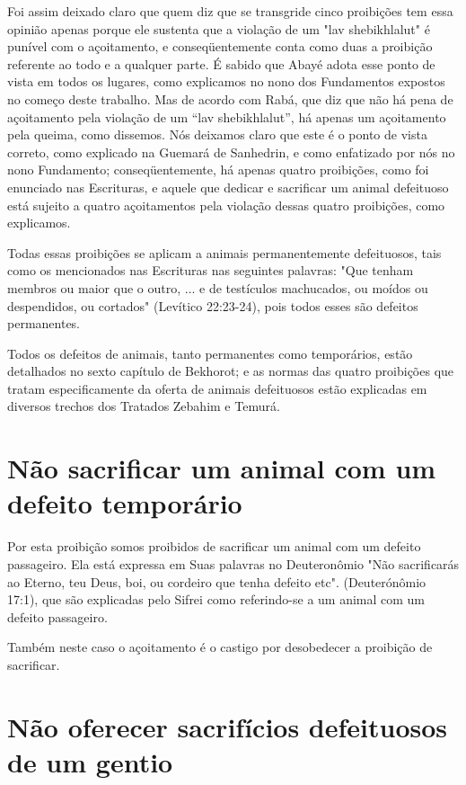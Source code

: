 Foi assim deixado claro que quem diz que se transgride cinco proi­bições
tem essa opinião apenas porque ele sustenta que a violação de um "lav
shebikhlalut" é punível com o açoitamento, e conseqüentemente conta como
duas a proibição referente ao todo e a qualquer parte. É sabido que
Abayé ado­ta esse ponto de vista em todos os lugares, como explicamos no
nono dos Fun­damentos expostos no começo deste trabalho. Mas de acordo
com Rabá, que diz que não há pena de açoitamento pela violação de um
``lav shebikhlalut'', há apenas um açoitamento pela queima, como dissemos.
Nós deixamos claro que este é o ponto de vista correto, como explicado
na Guemará de Sanhedrin, e como enfatizado por nós no nono Fundamento;
conseqüentemente, há ape­nas quatro proibições, como foi enunciado nas
Escrituras, e aquele que dedicar e sacrificar um animal defeituoso está
sujeito a quatro açoitamentos pela viola­ção dessas quatro proibições,
como explicamos.

Todas essas proibições se aplicam a animais permanentemente
de­feituosos, tais como os mencionados nas Escrituras nas seguintes
palavras: "Que tenham membros ou maior que o outro, ... e de testículos
machucados, ou moí­dos ou despendidos, ou cortados" (Levítico 22:23-24),
pois todos esses são de­feitos permanentes.

Todos os defeitos de animais, tanto permanentes como temporários, estão
detalhados no sexto capítulo de Bekhorot; e as normas das quatro
proibi­ções que tratam especificamente da oferta de animais defeituosos
estão expli­cadas em diversos trechos dos Tratados Zebahim e Temurá.


\section{Não sacrificar um animal com um defeito temporário}


Por esta proibição somos proibidos de sacrificar um animal com um
defeito passageiro. Ela está expressa em Suas palavras no Deuteronômio
"Não sacrificarás ao Eterno, teu Deus, boi, ou cordeiro que tenha
defeito etc". (Deu­terónômio 17:1), que são explicadas pelo Sifrei como
referindo-se a um animal com um defeito passageiro.

Também neste caso o açoitamento é o castigo por desobedecer a proi­bição
de sacrificar.


\section{Não oferecer sacrifícios defeituosos de um gentio}

